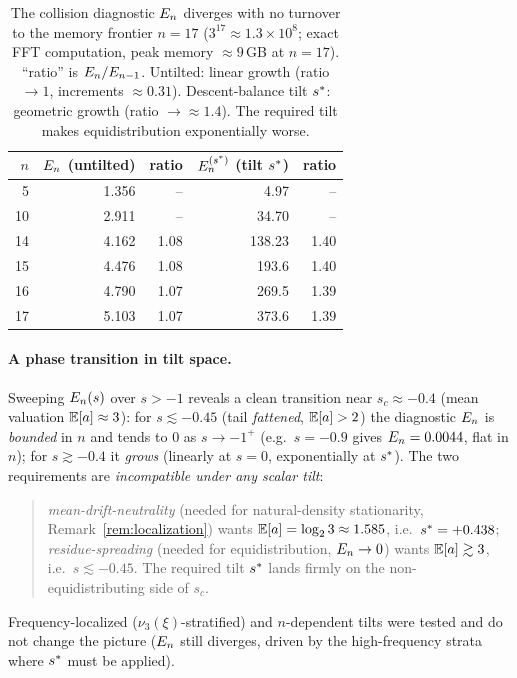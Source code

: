 \documentclass[11pt]{amsart}
\theoremstyle{definition}
\theoremstyle{remark}
\begin{document}
\begin{table}[t]
\centering
\begin{tabular}{@{}rrrrr@{}}
\toprule
$n$ & $E_n$ (untilted) & ratio & $E_n^{(s^{*})}$ (tilt $s^{*}$) & ratio\\
\midrule
 5 & 1.356 & --   & 4.97  & --   \\
10 & 2.911 & --   & 34.70 & --   \\
14 & 4.162 & 1.08 & 138.23& 1.40 \\
15 & 4.476 & 1.08 & 193.6 & 1.40 \\
16 & 4.790 & 1.07 & 269.5 & 1.39 \\
17 & 5.103 & 1.07 & 373.6 & 1.39 \\
\bottomrule
\end{tabular}
\caption{The collision diagnostic $E_n$ diverges with no turnover to the memory frontier
$n=17$ ($3^{17}\approx1.3\times10^8$; exact FFT computation, peak memory $\approx 9$\,GB at $n=17$).
``ratio'' is $E_n/E_{n-1}$. Untilted: linear growth (ratio $\to1$, increments
$\approx0.31$). Descent-balance tilt $s^{*}$: geometric growth (ratio $\to\approx1.4$).
The required tilt makes equidistribution exponentially worse.}
\label{tab:En}
\end{table}

\paragraph{A phase transition in tilt space.}
Sweeping $E_n(s)$ over $s>-1$ reveals a clean transition near $s_c\approx-0.4$ (mean valuation
$\mathbb{E}[a]\approx3$): for $s\lesssim-0.45$ (tail \emph{fattened}, $\mathbb{E}[a]>2$) the diagnostic $E_n$ is
\emph{bounded} in $n$ and tends to $0$ as $s\to-1^+$ (e.g.\ $s=-0.9$ gives $E_n=0.0044$, flat in
$n$); for $s\gtrsim-0.4$ it \emph{grows} (linearly at $s=0$, exponentially at $s^{*}$). The two
requirements are \emph{incompatible under any scalar tilt}:
\begin{quote}
\emph{mean-drift-neutrality} (needed for natural-density stationarity, Remark~\ref{rem:localization})
wants $\mathbb{E}[a]=\log_2 3\approx1.585$, i.e.\ $s^{*}=+0.438$; \emph{residue-spreading} (needed for
equidistribution, $E_n\to0$) wants $\mathbb{E}[a]\gtrsim3$, i.e.\ $s\lesssim-0.45$. The required tilt
$s^{*}$ lands firmly on the non-equidistributing side of $s_c$.
\end{quote}
Frequency-localized ($\nu_3(\xi)$-stratified) and $n$-dependent tilts were tested and do not change the
picture ($E_n$ still diverges, driven by the high-frequency strata where $s^{*}$ must be applied).
\end{document}
